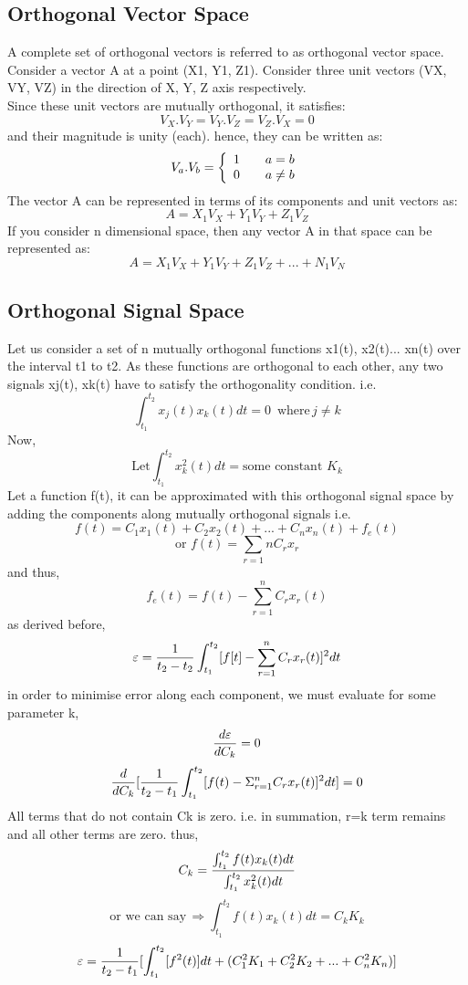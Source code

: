 \documentclass[a4paper,12pt]{book}
\begin{document}
\subsection{Orthogonal Vector Space}
A complete set of orthogonal vectors is referred to as orthogonal vector space.\\
Consider a vector A at a point (X1, Y1, Z1). Consider three unit vectors (VX, VY, VZ) in the direction of X, Y, Z axis respectively.\\
Since these unit vectors are mutually orthogonal, it satisfies:
$$V_X. V_Y= V_Y. V_Z= V_Z. V_X = 0$$
and their magnitude is unity (each).
hence, they can be written as:
\[V_a . V_b =  \left\{
\begin{array}{l l}
    1 & \quad a = b \\
    0 & \quad a \neq b
  \end{array} \right.
\]
The vector A can be represented in terms of its components and unit vectors as:
$$A = X_1 V_X + Y_1 V_Y + Z_1 V_Z$$
If you consider n dimensional space, then any vector A in that space can be represented as:
$$A = X_1 V_X + Y_1 V_Y + Z_1 V_Z+...+ N_1V_N$$
\subsection{Orthogonal Signal Space}
Let us consider a set of n mutually orthogonal functions x1(t), x2(t)... xn(t) over the interval t1 to t2. As these functions are orthogonal to each other, any two signals xj(t), xk(t) have to satisfy the orthogonality condition. i.e.
$$\int_{t_1}^{t_2} x_j(t)x_k(t)dt = 0 \,\,\, \text{where}\, j \neq k$$
Now,
$$\text{Let} \int_{t_1}^{t_2}x_{k}^{2}(t)dt =\text{some constant}\,\, K_k$$
Let a function f(t), it can be approximated with this orthogonal signal space by adding the components along mutually orthogonal signals i.e.
$$f(t) = C_1x_1(t) + C_2x_2(t) + ... + C_nx_n(t) + f_e(t)$$
$$\text{or}\,\, f(t) = \sum_{r=1}{n}C_rx_r $$
and thus,
$$f_e(t) = f(t) - \sum_{r=1}^n C_rx_r (t)$$
as derived before,
$$\varepsilon = {1 \over t_2 - t_2 } \int_{t_1}^{t_2} [ f[t] - \sum_{r=1}^{n} C_rx_r(t) ]^2 dt$$
in order to minimise error along each component, we must evaluate for some parameter k, $${d\varepsilon \over dC_k} = 0$$
$${d \over dC_k}[ {1 \over t_2 - t_1} \int_{t_1}^{t_2} [ f(t) - \Sigma_{r=1}^n C_rx_r(t)]^2 dt] = 0$$
All terms that do not contain Ck is zero. i.e. in summation, r=k term remains and all other terms are zero.
thus,
\begin{equation} C_k = {{\int_{t_1}^{t_2}f(t)x_k(t)dt} \over {\int_{t_1}^{t_2} x_k^2 (t)dt}}\end{equation}
$$\text{or we can say}\, \Rightarrow \int_{t_1}^{t_2} f(t)x_k(t)dt = C_kK_k$$
$$\varepsilon = {1 \over t_2 - t_1 } [\int_{t_1}^{t_2} [f^2 (t)] dt + (C_1^2 K_1 + C_2^2 K_2 + ... + C_n^2 K_n)]$$
\end{document}

